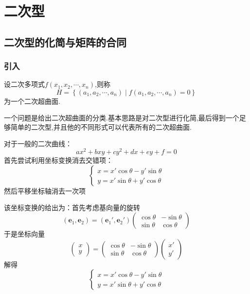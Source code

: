 \newpage
\chapter{二次型}
\section{二次型的化简与矩阵的合同}
\subsection{引入}
\begin{formal}
    \begin{definition}[二次超曲面的定义]\label{def:二次超曲面的定义}
        设二次多项式$f\left(
            x_{1},x_{2},\cdots,x_{n}
        \right)$,则称\[
        H=\left\{
            \left(a_1,
            a_2,\cdots,a_n
            \right)\mid f\left(
                a_1,a_2,\cdots,a_n
            \right)=0
        \right\}
        \]为一个二次超曲面.
    \end{definition}
\end{formal}
\begin{red}
\begin{remark}
    一个问题是给出二次超曲面的分类.基本思路是对二次型进行化简,最后得到一个足够简单的二次型,并且他的不同形式可以代表所有的二次超曲面.
\end{remark}
\end{red}
对于一般的二次曲线：\[
ax^2+bxy+cy^2+dx+ey+f=0
\]首先尝试利用坐标变换消去交错项：\[
\begin{cases*}
    x=x'\cos\theta-y'\sin\theta\\
    y=x'\sin\theta+y'\cos\theta
\end{cases*}
\]然后平移坐标轴消去一次项
\begin{red}
\begin{remark}
    该坐标变换的给出为：首先考虑基向量的旋转\[
    \left(
        \bm{e}_1,\bm{e}_2
    \right)=\left(
        \bm{e}_1',\bm{e}_2'
    \right)\begin{pmatrix}
        \cos\theta&-\sin\theta\\
        \sin\theta&\cos\theta
    \end{pmatrix}
    \]于是坐标向量\[
    \begin{pmatrix}
        x\\y
    \end{pmatrix}=\begin{pmatrix}
        \cos \theta&-\sin\theta\\
        \sin\theta&\cos\theta
    \end{pmatrix}\begin{pmatrix}
        x'\\y'
    \end{pmatrix}
    \]解得\[
    \begin{cases*}
        x=x'\cos\theta-y'\sin\theta\\
        y=x'\sin\theta+y'\cos\theta
    \end{cases*}
    \]
\end{remark}
\end{red}


